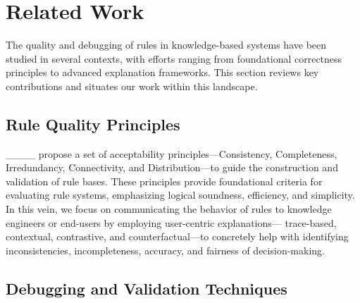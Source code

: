 \section{Related Work}
\label{sec:related-work}

The quality and debugging of rules in knowledge-based systems have been studied in several contexts, with efforts ranging from foundational correctness principles to advanced explanation frameworks. This section reviews key contributions and situates our work within this landscape.

\subsection{Rule Quality Principles}

____ propose a set of acceptability principles—Consistency, Completeness, Irredundancy, Connectivity, and Distribution—to guide the construction and validation of rule bases. These principles provide foundational criteria for evaluating rule systems, emphasizing logical soundness, efficiency, and simplicity. 
In this vein, we focus on communicating the behavior of rules to knowledge engineers or end-users by employing user-centric explanations— trace-based, contextual, contrastive, and counterfactual—to concretely help with identifying inconsistencies, incompleteness, accuracy, and fairness of decision-making.


\subsection{Debugging and Validation Techniques}


